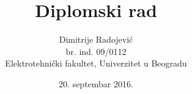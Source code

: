 \documentclass[12pt,a4paper,titlepage]{report}
\author{Dimitrije Radojević \\ br. ind. 09/0112 \\ Elektrotehnički fakultet, Univerzitet u Beogradu}
\title{Diplomski rad}
\date{20. septembar 2016.}
\begin{document}
\maketitle
\tableofcontents





\renewcommand\bibname{Reference}
\printbibliography
\end{document}
